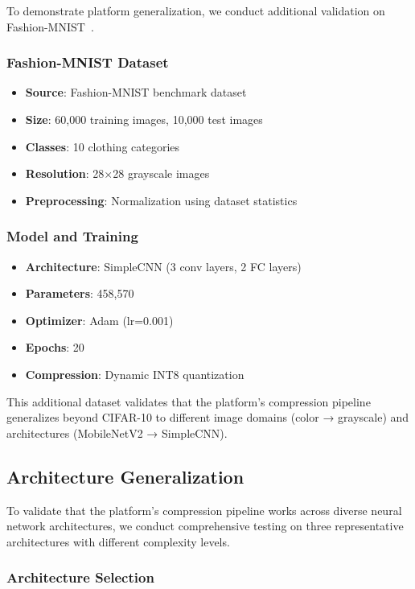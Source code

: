 To demonstrate platform generalization, we conduct additional validation on Fashion-MNIST~\cite{fashion_mnist}.

\subsubsection{Fashion-MNIST Dataset}
\begin{itemize}
\item \textbf{Source}: Fashion-MNIST benchmark dataset
\item \textbf{Size}: 60,000 training images, 10,000 test images
\item \textbf{Classes}: 10 clothing categories
\item \textbf{Resolution}: 28$\times$28 grayscale images
\item \textbf{Preprocessing}: Normalization using dataset statistics
\end{itemize}

\subsubsection{Model and Training}
\begin{itemize}
\item \textbf{Architecture}: SimpleCNN (3 conv layers, 2 FC layers)
\item \textbf{Parameters}: 458,570
\item \textbf{Optimizer}: Adam (lr=0.001)
\item \textbf{Epochs}: 20
\item \textbf{Compression}: Dynamic INT8 quantization
\end{itemize}

This additional dataset validates that the platform's compression pipeline generalizes beyond CIFAR-10 to different image domains (color → grayscale) and architectures (MobileNetV2 → SimpleCNN).

\subsection{Architecture Generalization}

To validate that the platform's compression pipeline works across diverse neural network architectures, we conduct comprehensive testing on three representative architectures with different complexity levels.

\subsubsection{Architecture Selection}

